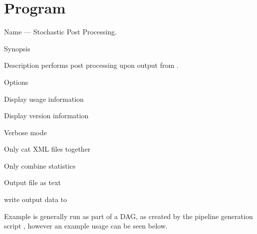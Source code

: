 
\section{Program }
\label{program:lalapps-stopp}

\begin{entry}
\item[Name]
 --- Stochastic Post Processing.

\item[Synopsis]
  \newline \hspace*{0.5in}
 \newline \hspace*{0.5in}
 \newline \hspace*{0.5in}
 \newline \hspace*{0.5in}
 \newline \hspace*{0.5in}
 \newline \hspace*{0.5in}
 \newline \hspace*{0.5in}
 

\item[Description]
 performs post processing upon output from
.

\item[Options]\leavevmode
\begin{entry}
\item[\option{--help}]
Display usage information
\item[\option{--version}]
Display version information
\item[\option{--verbose}]
Verbose mode
\item[\option{--cat-only}]
Only cat XML files together
\item[\option{--analyse-only}]
Only combine statistics
\item[\option{--text}]
Output file as text
\item[\option{--output} \parm{FILE}]
write output data to 
\end{entry}

\item[Example]
 is generally run as part of a DAG, as created by
the pipeline generation script , however
an example usage can be seen below.


\end{entry}
